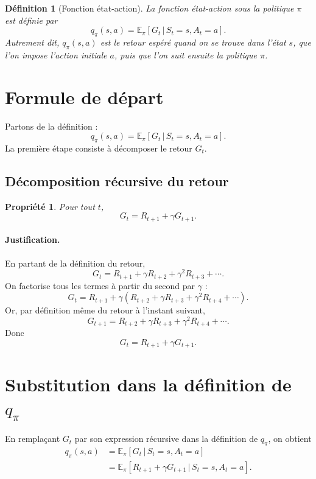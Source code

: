 \documentclass[11pt,a4paper]{article}
\newtheorem*{definition}{Définition}
\newtheorem*{propriete}{Propriété}
\newcommand{\E}{\mathbb{E}}
\newcommand{\given}{\,|\,}
\begin{document}
\begin{definition}[Fonction état-action]
La fonction état-action sous la politique $\pi$ est définie par
\[
q_{\pi}(s,a) = \E_{\pi}[G_t \given S_t=s, A_t=a].
\]
Autrement dit, $q_{\pi}(s,a)$ est le retour espéré quand on se trouve dans l'état $s$, que l'on impose l'action initiale $a$, puis que l'on suit ensuite la politique $\pi$.
\end{definition}

\section{Formule de départ}

Partons de la définition :
\[
q_{\pi}(s,a) = \E_{\pi}[G_t \given S_t=s, A_t=a].
\]
La première étape consiste à décomposer le retour $G_t$.

\subsection{Décomposition récursive du retour}

\begin{propriete}
Pour tout $t$,
\[
G_t = R_{t+1} + \gamma G_{t+1}.
\]
\end{propriete}

\paragraph{Justification.}
En partant de la définition du retour,
\[
G_t = R_{t+1} + \gamma R_{t+2} + \gamma^2 R_{t+3} + \cdots.
\]
On factorise tous les termes à partir du second par $\gamma$ :
\[
G_t = R_{t+1} + \gamma\left(R_{t+2} + \gamma R_{t+3} + \gamma^2 R_{t+4} + \cdots\right).
\]
Or, par définition même du retour à l'instant suivant,
\[
G_{t+1} = R_{t+2} + \gamma R_{t+3} + \gamma^2 R_{t+4} + \cdots.
\]
Donc
\[
G_t = R_{t+1} + \gamma G_{t+1}.
\]

\section{Substitution dans la définition de $q_{\pi}$}

En remplaçant $G_t$ par son expression récursive dans la définition de $q_{\pi}$, on obtient
\begin{align*}
q_{\pi}(s,a)
&= \E_{\pi}[G_t \given S_t=s, A_t=a] \\
&= \E_{\pi}[R_{t+1} + \gamma G_{t+1} \given S_t=s, A_t=a].
\end{align*}
\end{document}
